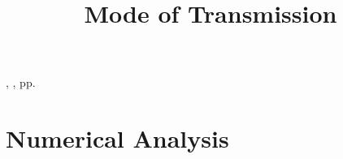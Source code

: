 \documentclass[12pt]{article}
\title{Mode of Transmission}
\date{} %
\begin{document}

\begin{htmlonly}
\href{\jref}{\jhead}, \jdate, pp.\
\end{htmlonly}

\maketitle
\thispagestyle{firstpage}



\section{Numerical Analysis}
\end{document}
